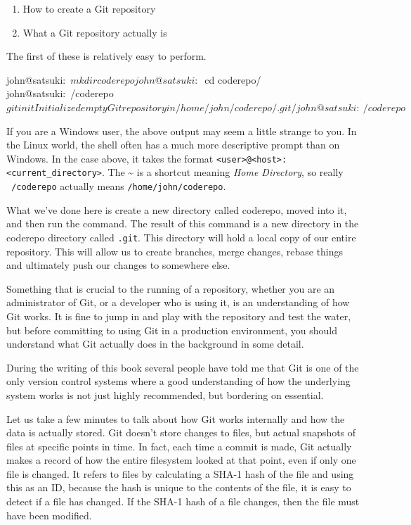 \begin{enumerate}
  \item How to create a Git repository
  \item What a Git repository actually is
\end{enumerate}

The first of these is relatively easy to perform.

\begin{code}
john@satsuki:~$ mkdir coderepo
john@satsuki:~$ cd coderepo/
john@satsuki:~/coderepo$ git init
Initialized empty Git repository in /home/john/coderepo/.git/
john@satsuki:~/coderepo$
\end{code}

If you are a Windows user, the above output may seem a little strange to you.
In the Linux world, the shell often has a much more descriptive prompt than on Windows.
In the case above, it takes the format \texttt{<user>@<host>:<current\_directory>}.
The \textasciitilde{} is a shortcut meaning \emph{Home Directory}, so really \texttt{~/coderepo} actually means \texttt{/home/john/coderepo}.

What we've done here is create a new directory called coderepo, moved into it, and then run the  command.
The result of this command is a new directory in the coderepo directory called \texttt{.git}.
This directory will hold a local copy of our entire repository.
This will allow us to create branches, merge changes, rebase things and ultimately push our changes to somewhere else.

Something that is crucial to the running of a repository, whether you are an administrator of Git, or a developer who is using it, is an understanding of how Git works.
It is fine to jump in and play with the repository and test the water, but before committing to using Git in a production environment, you should understand what Git actually does in the background in some detail.

During the writing of this book several people have told me that Git is one of the only version control systems where a good understanding of how the underlying system works is not just highly recommended, but bordering on essential.

Let us take a few minutes to talk about how Git works internally and how the data is actually stored.
Git doesn't store changes to files, but actual snapshots of files at specific points in time.
In fact, each time a commit is made, Git actually makes a record of how the entire filesystem looked at that point, even if only one file is changed.
It refers to files by calculating a SHA-1 hash of the file and using this as an ID, because the hash is unique to the contents of the file, it is easy to detect if a file has changed.
If the SHA-1 hash of a file changes, then the file must have been modified.


